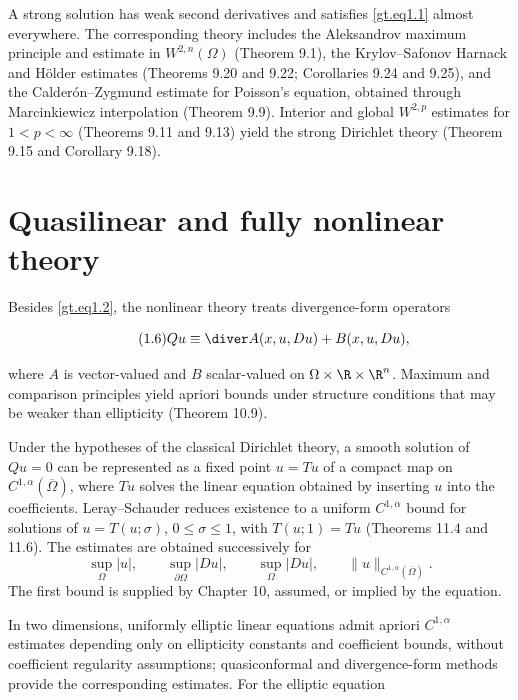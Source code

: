 A strong solution has weak second derivatives and satisfies
\eqref{gt.eq1.1} almost everywhere. The corresponding theory includes the
Aleksandrov maximum principle and estimate in $W^{2,n}(\Omega)$ (Theorem 9.1),
the Krylov--Safonov Harnack and H\"older estimates (Theorems 9.20 and 9.22;
Corollaries 9.24 and 9.25), and the Calder\'on--Zygmund estimate for Poisson's
equation, obtained through Marcinkiewicz interpolation (Theorem 9.9). Interior
and global $W^{2,p}$ estimates for
$1<p<\infty$ (Theorems 9.11 and 9.13) yield the strong Dirichlet theory
(Theorem 9.15 and Corollary 9.18).

\section*{Quasilinear and fully nonlinear theory}

Besides \eqref{gt.eq1.2}, the nonlinear theory treats divergence-form operators

\begin{equation}\label{gt.eq1.9}
\tag{1.6}
Qu \equiv \diver A(x, u, Du) + B(x, u, Du),
\end{equation}

where $A$ is vector-valued and $B$ scalar-valued on
$\Omega\times\R\times\R^n$. Maximum and comparison principles yield apriori
bounds under structure conditions that may be weaker than ellipticity
(Theorem 10.9).

Under the hypotheses of the classical Dirichlet theory, a smooth solution of
$Qu=0$ can be represented as a fixed point $u=Tu$ of a compact map on
$C^{1,\alpha}(\overline\Omega)$, where $Tu$ solves the linear equation obtained by
inserting $u$ into the coefficients. Leray--Schauder reduces existence to a uniform
$C^{1,\alpha}$ bound for solutions of
$u=T(u;\sigma)$, $0\leq\sigma\leq1$, with $T(u;1)=Tu$ (Theorems 11.4 and
11.6). The estimates are obtained successively for
\[
\sup_{\Omega}|u|,\qquad
\sup_{\partial\Omega}|Du|,\qquad
\sup_{\Omega}|Du|,\qquad
\|u\|_{C^{1,\alpha}(\overline\Omega)}.
\]
The first bound is supplied by Chapter 10, assumed, or implied by the equation.

In two dimensions, uniformly elliptic linear equations admit apriori
$C^{1,\alpha}$ estimates depending only on ellipticity constants and coefficient
bounds, without coefficient regularity assumptions; quasiconformal and
divergence-form methods provide the corresponding estimates. For the elliptic
equation

